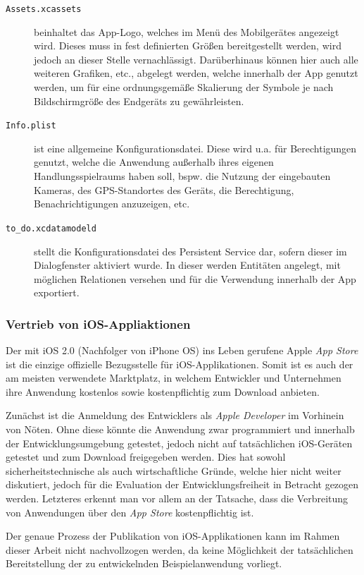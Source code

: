 \begin{description}
	\item[\texttt{Assets.xcassets}] beinhaltet das App-Logo, welches im Menü des Mobilgerätes angezeigt wird. Dieses muss in fest definierten Größen bereitgestellt werden, wird jedoch an dieser Stelle vernachlässigt. Darüberhinaus können hier auch alle weiteren Grafiken, etc., abgelegt werden, welche innerhalb der App genutzt werden, um für eine ordnungsgemäße Skalierung der Symbole je nach Bildschirmgröße des Endgeräts zu gewährleisten.
	\item[\texttt{Info.plist}] ist eine allgemeine Konfigurationsdatei. Diese wird u.a. für Berechtigungen genutzt, welche die Anwendung außerhalb ihres eigenen Handlungsspielraums haben soll, bspw. die Nutzung der eingebauten Kameras, des GPS-Standortes des Geräts, die Berechtigung, Benachrichtigungen anzuzeigen, etc.
	\item[\texttt{to\_do.xcdatamodeld}] stellt die Konfigurationsdatei des Persistent Service dar, sofern dieser im Dialogfenster aktiviert wurde. In dieser werden Entitäten angelegt, mit möglichen Relationen versehen und für die Verwendung innerhalb der App exportiert.
\end{description}

\subsubsection{Vertrieb von iOS-Appliaktionen}
Der mit iOS 2.0 (Nachfolger von iPhone OS) ins Leben gerufene Apple \textit{App Store} ist die einzige offizielle Bezugsstelle für iOS-Applikationen. Somit ist es auch der am meisten verwendete Marktplatz, in welchem Entwickler und Unternehmen ihre Anwendung kostenlos sowie kostenpflichtig zum Download anbieten.

Zunächst ist die Anmeldung des Entwicklers als \textit{Apple Developer} im Vorhinein von Nöten. Ohne diese könnte die Anwendung zwar programmiert und innerhalb der Entwicklungsumgebung getestet, jedoch nicht auf tatsächlichen iOS-Geräten getestet und zum Download freigegeben werden. Dies hat sowohl sicherheitstechnische als auch wirtschaftliche Gründe, welche hier nicht weiter diskutiert, jedoch für die Evaluation der Entwicklungsfreiheit in Betracht gezogen werden. Letzteres erkennt man vor allem an der Tatsache, dass die Verbreitung von Anwendungen über den \textit{App Store} kostenpflichtig ist.

Der genaue Prozess der Publikation von iOS-Applikationen kann im Rahmen dieser Arbeit nicht nachvollzogen werden, da keine Möglichkeit der tatsächlichen Bereitstellung der zu entwickelnden Beispielanwendung vorliegt.

